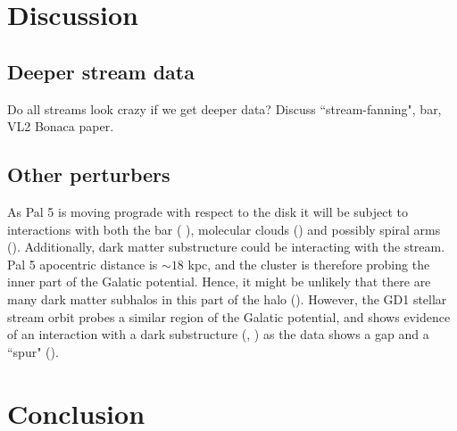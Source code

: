 \documentclass[twocolumn]{aastex62}
\begin{document}
% 
% 
% 




\section{Discussion}
\label{sec:discussion}

\subsection{Deeper stream data}
Do all streams look crazy if we get deeper data? Discuss ``stream-fanning", bar, VL2 Bonaca paper. 

\subsection{Other perturbers}
As Pal 5 is moving prograde with respect to the disk it will be subject to interactions with both the bar (\citealt{Hattori:2016}%
), molecular clouds (\citealt{Amorisco:2016}) and possibly spiral arms (\citealt{Banik:2019}). Additionally, dark matter substructure could be interacting with the stream. Pal 5 apocentric distance is $\sim 18$ kpc, and the cluster is therefore probing the inner part of the Galatic potential. Hence, it might be unlikely that there are many dark matter subhalos in this part of the halo (\citealt{Garrison-Kimmel:2017}). However, the GD1 stellar stream orbit probes a similar region of the Galatic potential, and shows evidence of an interaction with a dark substructure (\citealt{Price-Whelan:2018}, \citealt{Bonaca:2018b}) as the data shows a gap and a ``spur" (\citealt{Yoon:2011}). 



\section{Conclusion}
\label{sec:conclusion}
\end{document}
